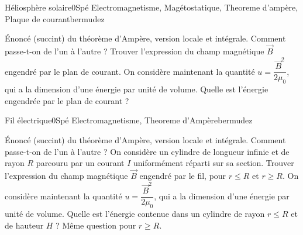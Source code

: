 \begin{exercise}{Héliosphère solaire}{0}{Spé}
{Electromagnetisme, Magétostatique, Theoreme d'ampère, Plaque de courant}{bermudez}

\begin{questions}
    \questioncours Énoncé (succint) du théorème d'Ampère, version locale et intégrale. Comment passe-t-on de l'un à l'autre ?
    \question Trouver l'expression du champ magnétique $\vec{B}$ engendré par le plan de courant.
    \question On considère maintenant la quantité $u = \dfrac{\vec{B}^2}{2\mu_0}$, qui a la dimension d'une énergie par unité de volume. Quelle est l'énergie engendrée par le plan de courant ?
\end{questions}

\end{exercise}


\begin{exercise}{Fil électrique}{0}{Spé}
{Electromagnetisme, Theoreme d'Ampère}{bermudez}

\begin{questions}
    \questioncours Énoncé (succint) du théorème d'Ampère, version locale et intégrale. Comment passe-t-on de l'un à l'autre ?
    \question On considère un cylindre de longueur infinie et de rayon $R$ parcouru par un courant $I$ uniformément réparti sur sa section. Trouver l'expression du champ magnétique $\vec{B}$ engendré par le fil, pour $r \leq R$ et $r \geq R$.
    \question On considère maintenant la quantité $u = \dfrac{\vec{B}^2}{2\mu_0}$, qui a la dimension d'une énergie par unité de volume. Quelle est l'énergie contenue dans un cylindre de rayon $r \leq R$ et de hauteur $H$ ? Même question pour $r \geq R$.
\end{questions}

\end{exercise}


